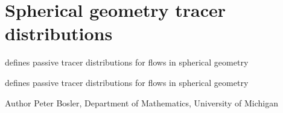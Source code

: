 \hypertarget{group___tracers}{\section{Spherical geometry tracer distributions}
\label{group___tracers}
}


defines passive tracer distributions for flows in spherical geometry  


defines passive tracer distributions for flows in spherical geometry 

\begin{DoxyAuthor}{Author}
Peter Bosler, Department of Mathematics, University of Michigan 
\end{DoxyAuthor}
